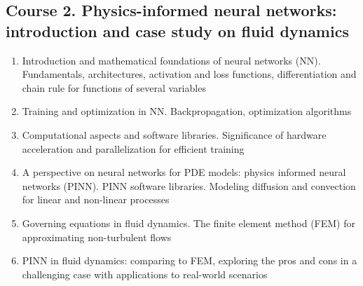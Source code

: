 \documentclass[letterpaper]{inzane_syllabus} %
\begin{document}
\subsection{Course 2. Physics-informed neural networks: introduction and case study on fluid dynamics}
\begin{enumerate}
  \item Introduction and mathematical foundations of neural networks (NN). Fundamentals, architectures, activation and loss functions, differentiation and chain rule for functions of several variables
  \item Training and optimization in NN. Backpropagation, optimization algorithms
  \item Computational aspects and software libraries. Significance of hardware acceleration and parallelization for efficient training 
  \item A perspective on neural networks for PDE models: physics informed neural networks (PINN). PINN software libraries. Modeling diffusion and convection for linear and non-linear processes
  \item Governing equations in fluid dynamics. The finite element method (FEM) for approximating non-turbulent flows   
  \item PINN in fluid dynamics: comparing to FEM, exploring the pros and cons in a challenging case with applications to real-world scenarios 
\end{enumerate}
\end{document}
